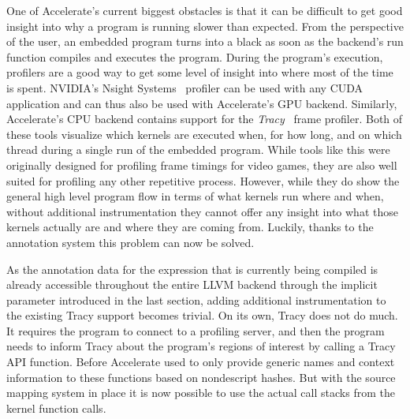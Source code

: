 \documentclass[fontsize=11pt,a4paper,parskip=half,numbers=noenddot]{scrartcl}
\begin{document}
One of Accelerate's current biggest obstacles is that it can be difficult to get
good insight into why a program is running slower than expected. From the
perspective of the user, an embedded program turns into a black as soon as the
backend's run function compiles and executes the program. During the program's
execution, profilers are a good way to get some level of insight into where most
of the time is spent. NVIDIA's Nsight Systems~\cite{nvidia-nsight-systems}
profiler can be used with any CUDA application and can thus also be used with
Accelerate's GPU backend. Similarly, Accelerate's CPU backend contains support
for the \emph{Tracy}~\cite{tracy-profiler} frame profiler. Both of these tools
visualize which kernels are executed when, for how long, and on which thread
during a single run of the embedded program. While tools like this were
originally designed for profiling frame timings for video games, they are also
well suited for profiling any other repetitive process. However, while they do
show the general high level program flow in terms of what kernels run where and
when, without additional instrumentation they cannot offer any insight into what
those kernels actually are and where they are coming from. Luckily, thanks to
the annotation system this problem can now be solved.

As the annotation data for the expression that is currently being compiled is
already accessible throughout the entire LLVM backend through the implicit
parameter introduced in the last section, adding additional instrumentation to
the existing Tracy support becomes trivial. On its own, Tracy does not do much.
It requires the program to connect to a profiling server, and then the program
needs to inform Tracy about the program's regions of interest by calling a Tracy
API function. Before Accelerate used to only provide generic names and context
information to these functions based on nondescript hashes. But with the source
mapping system in place it is now possible to use the actual call stacks from
the kernel function calls.
\end{document}
